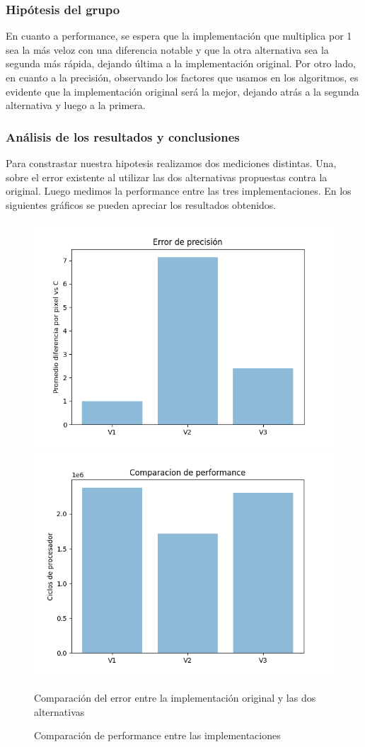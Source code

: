\subsubsection{Hipótesis del grupo}
\par En cuanto a performance, se espera que la implementación que multiplica por 1 sea la más veloz con una diferencia notable y que la otra alternativa
sea la segunda más rápida, dejando última a la implementación original.
Por otro lado, en cuanto a la precisión, observando los factores que usamos en los algoritmos, es evidente que la implementación original será la mejor,
dejando atrás a la segunda alternativa y luego a la primera.


\subsubsection{Análisis de los resultados y conclusiones}
\par Para constrastar nuestra hipotesis realizamos dos mediciones distintas. Una, sobre el error existente al utilizar las dos alternativas propuestas contra la original. Luego 
medimos la performance entre las tres implementaciones. En los siguientes gráficos se pueden apreciar los resultados obtenidos.

\begin{figure}[h]
    \centering
        \includegraphics[width=0.5\linewidth]{img/ComparacionErrorExperimentoPato.png}\hfil
        \includegraphics[width=0.5\linewidth]{img/ComparacionPerformanceExperimentoPato.png}\par\medskip
        \caption{Comparación del error entre la implementación original y las dos alternativas}
        \caption{Comparación de performance entre las implementaciones}
\end{figure}

